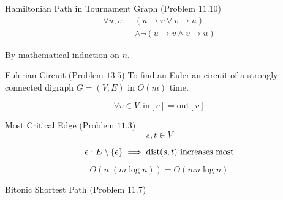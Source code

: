 
\begin{frame}{}
  \begin{exampleblock}{Hamiltonian Path in Tournament Graph (Problem $11.10$)}
    \begin{align*}
      \forall u, v:\; &(u \to v \lor v \to u) \\
	    &\land \lnot (u \to v \land v \to u)
    \end{align*}
  \end{exampleblock}

  \pause
  \vspace{0.60cm}
  \centerline{By mathematical induction on $n$.}
\end{frame}

\begin{frame}{}
  \begin{exampleblock}{Eulerian Circuit (Problem $13.5$)}
    To find an Eulerian circuit of a strongly connected digraph $G = (V, E)$ in $O(m)$ time. 
  \end{exampleblock}

  \pause
  \[
    \forall v \in V: \text{in}[v] = \text{out}[v]
  \]

  \pause
\end{frame}

\begin{frame}{}
  

  \pause
  \vspace{0.50cm}
  \centerline{}
\end{frame}

\begin{frame}{}
  \begin{exampleblock}{Most Critical Edge (Problem $11.3$)}
    \[
      s, t \in V
    \]

    \[
      e: E \setminus \{e\} \implies \text{dist}(s,t) \text{ increases most}
    \]
  \end{exampleblock}

  \pause
  \vspace{0.30cm}

  \pause
  \[
    O(n \; (m \log n)) = O(mn \log n)
  \]
\end{frame}

\begin{frame}{}
  \begin{exampleblock}{Bitonic Shortest Path (Problem $11.7$)}
  \end{exampleblock}

  \pause
  \vspace{0.30cm}
\end{frame}
